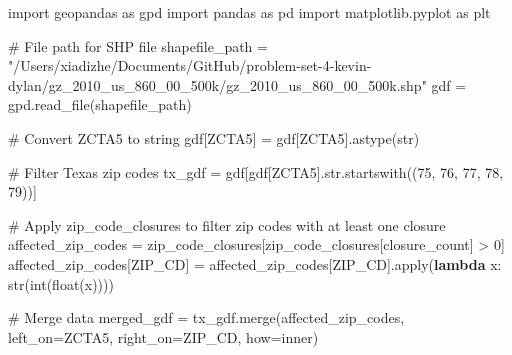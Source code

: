 \documentclass[
  letterpaper,
  DIV=11,
  numbers=noendperiod]{scrartcl}
\newenvironment{Shaded}{\begin{snugshade}}{\end{snugshade}}
\newcommand{\BuiltInTok}[1]{\textcolor[rgb]{0.00,0.23,0.31}{#1}}
\newcommand{\CommentTok}[1]{\textcolor[rgb]{0.37,0.37,0.37}{#1}}
\newcommand{\DecValTok}[1]{\textcolor[rgb]{0.68,0.00,0.00}{#1}}
\newcommand{\ImportTok}[1]{\textcolor[rgb]{0.00,0.46,0.62}{#1}}
\newcommand{\KeywordTok}[1]{\textcolor[rgb]{0.00,0.23,0.31}{\textbf{#1}}}
\newcommand{\NormalTok}[1]{\textcolor[rgb]{0.00,0.23,0.31}{#1}}
\newcommand{\OperatorTok}[1]{\textcolor[rgb]{0.37,0.37,0.37}{#1}}
\newcommand{\StringTok}[1]{\textcolor[rgb]{0.13,0.47,0.30}{#1}}
\begin{document}
\begin{Shaded}
\begin{Highlighting}[]
\ImportTok{import}\NormalTok{ geopandas }\ImportTok{as}\NormalTok{ gpd}
\ImportTok{import}\NormalTok{ pandas }\ImportTok{as}\NormalTok{ pd}
\ImportTok{import}\NormalTok{ matplotlib.pyplot }\ImportTok{as}\NormalTok{ plt}

\CommentTok{\# File path for SHP file}
\NormalTok{shapefile\_path }\OperatorTok{=} \StringTok{"/Users/xiadizhe/Documents/GitHub/problem{-}set{-}4{-}kevin{-}dylan/gz\_2010\_us\_860\_00\_500k/gz\_2010\_us\_860\_00\_500k.shp"}
\NormalTok{gdf }\OperatorTok{=}\NormalTok{ gpd.read\_file(shapefile\_path)}

\CommentTok{\# Convert ZCTA5 to string}
\NormalTok{gdf[}\StringTok{\textquotesingle{}ZCTA5\textquotesingle{}}\NormalTok{] }\OperatorTok{=}\NormalTok{ gdf[}\StringTok{\textquotesingle{}ZCTA5\textquotesingle{}}\NormalTok{].astype(}\BuiltInTok{str}\NormalTok{)}

\CommentTok{\# Filter Texas zip codes}
\NormalTok{tx\_gdf }\OperatorTok{=}\NormalTok{ gdf[gdf[}\StringTok{\textquotesingle{}ZCTA5\textquotesingle{}}\NormalTok{].}\BuiltInTok{str}\NormalTok{.startswith((}\StringTok{\textquotesingle{}75\textquotesingle{}}\NormalTok{, }\StringTok{\textquotesingle{}76\textquotesingle{}}\NormalTok{, }\StringTok{\textquotesingle{}77\textquotesingle{}}\NormalTok{, }\StringTok{\textquotesingle{}78\textquotesingle{}}\NormalTok{, }\StringTok{\textquotesingle{}79\textquotesingle{}}\NormalTok{))]}

\CommentTok{\# Apply zip\_code\_closures to filter zip codes with at least one closure}
\NormalTok{affected\_zip\_codes }\OperatorTok{=}\NormalTok{ zip\_code\_closures[zip\_code\_closures[}\StringTok{\textquotesingle{}closure\_count\textquotesingle{}}\NormalTok{] }\OperatorTok{\textgreater{}} \DecValTok{0}\NormalTok{]}
\NormalTok{affected\_zip\_codes[}\StringTok{\textquotesingle{}ZIP\_CD\textquotesingle{}}\NormalTok{] }\OperatorTok{=}\NormalTok{ affected\_zip\_codes[}\StringTok{\textquotesingle{}ZIP\_CD\textquotesingle{}}\NormalTok{].}\BuiltInTok{apply}\NormalTok{(}\KeywordTok{lambda}\NormalTok{ x: }\BuiltInTok{str}\NormalTok{(}\BuiltInTok{int}\NormalTok{(}\BuiltInTok{float}\NormalTok{(x))))}

\CommentTok{\# Merge data}
\NormalTok{merged\_gdf }\OperatorTok{=}\NormalTok{ tx\_gdf.merge(affected\_zip\_codes, left\_on}\OperatorTok{=}\StringTok{\textquotesingle{}ZCTA5\textquotesingle{}}\NormalTok{, right\_on}\OperatorTok{=}\StringTok{\textquotesingle{}ZIP\_CD\textquotesingle{}}\NormalTok{, how}\OperatorTok{=}\StringTok{\textquotesingle{}inner\textquotesingle{}}\NormalTok{)}


\end{Highlighting}
\end{Shaded}
\end{document}
